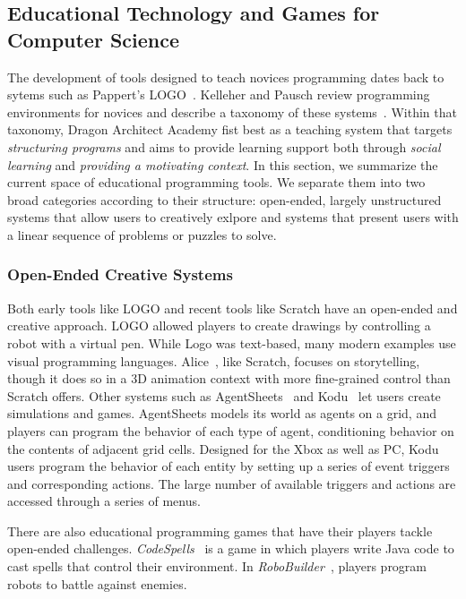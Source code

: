 \documentclass{sig-alternate}
\newcommand{\gametitle}{{\color{RoyalPurple} Dragon Architect Academy}}
\begin{document}
\subsection{Educational Technology and Games for Computer Science}

The development of tools designed to teach novices programming dates back to sytems such as Pappert's LOGO~\cite{papert80mindstorms}.
Kelleher and Pausch review programming environments for novices and describe a taxonomy of these systems~\cite{kelleher2005lowering}.
Within that taxonomy, \gametitle{} fist best as a teaching system that targets \emph{structuring programs} and aims to provide learning support both through \emph{social learning} and \emph{providing a motivating context}. 
In this section, we summarize the current space of educational programming tools. 
We separate them into two broad categories according to their structure: open-ended, largely unstructured systems that allow users to creatively exlpore and systems that present users with a linear sequence of problems or puzzles to solve. 

\subsubsection{Open-Ended Creative Systems}
Both early tools like LOGO and recent tools like Scratch have an open-ended and creative approach.
LOGO allowed players to create drawings by controlling a robot with a virtual pen.
While Logo was text-based, many modern examples use visual programming languages. 
Alice~\cite{cooper2000alice}, like Scratch, focuses on storytelling, though it does so in a 3D animation context with more fine-grained control than Scratch offers.
Other systems such as AgentSheets~\cite{repenning2000agentsheets} and Kodu~\cite{kodu} let users create simulations and games.
AgentSheets models its world as agents on a grid, and players can program the behavior of each type of agent, conditioning behavior on the contents of adjacent grid cells. 
Designed for the Xbox as well as PC, Kodu users program the behavior of each entity by setting up a series of event triggers and corresponding actions. The large number of available triggers and actions are accessed through a series of menus. 

There are also educational programming games that have their players tackle open-ended challenges.
\emph{CodeSpells}~\cite{esper2013codespells} is a game in which players write Java code to cast spells that control their environment. 
In \emph{RoboBuilder}~\cite{weintrop2013robobuilder}, players program robots to battle against enemies.
\end{document}
